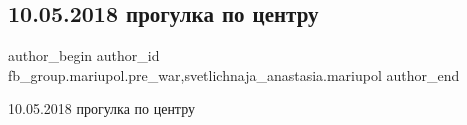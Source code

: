  
 
 
 
 

\subsection{10.05.2018 прогулка по центру}
\label{sec:01_03_2023.fb.fb_group.mariupol.pre_war.1.10_05_2018_progulka_}
 
\ifcmt
 author_begin
   author_id fb_group.mariupol.pre_war,svetlichnaja_anastasia.mariupol
 author_end
\fi

10.05.2018 прогулка по центру 💓
